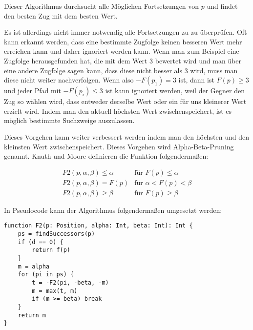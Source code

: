 Dieser Algorithmus durchsucht alle Möglichen Fortsetzungen von $p$ und findet den besten Zug mit dem besten Wert. 
\cite{knuth_analysis_1975}

Es ist allerdings nicht immer notwendig alle Fortsetzungen zu zu überprüfen. Oft kann erkannt werden, dass eine bestimmte Zugfolge keinen besseren Wert mehr erreichen kann und daher ignoriert werden kann.
Wenn man zum Beispiel eine Zugfolge herausgefunden hat, die mit dem Wert 3 bewertet wird und man über eine andere Zugfolge sagen kann, dass diese nicht besser als 3 wird, muss man diese nicht weiter nachverfolgen. Wenn also $-F(p_1) = 3$ ist, dann ist $F(p) \geq 3$ und jeder Pfad mit $-F(p_i) \leq 3$ ist kann ignoriert werden, weil der Gegner den Zug so wählen wird,  dass entweder derselbe Wert oder ein für uns kleinerer Wert erzielt wird. Indem man den aktuell höchsten Wert zwischenspeichert, ist es möglich bestimmte Suchzweige auszulassen.
\cite{knuth_analysis_1975}


Dieses Vorgehen kann weiter verbessert werden indem man den höchsten und den kleinsten Wert zwischenspeichert. Dieses Vorgehen wird Alpha-Beta-Pruning genannt. Knuth und Moore definieren die Funktion folgendermaßen:

\begin{equation}
    \begin{array}{ll}
        F2(p, \alpha, \beta) \leq \alpha & \text{für }F(p) \leq \alpha \\
        F2(p, \alpha, \beta) = F(p) & \text{für }\alpha < F(p) < \beta \\
        F2(p, \alpha, \beta) \geq \beta & \text{für }F(p) \geq \beta
    \end{array}
\end{equation}

In Pseudocode kann der Algorithmus folgendermaßen umgesetzt werden:
\begin{lstlisting}
function F2(p: Position, alpha: Int, beta: Int): Int {
    ps = findSuccessors(p)
    if (d == 0) {
        return f(p)
    }
    m = alpha
    for (pi in ps) {
        t = -F2(pi, -beta, -m)
        m = max(t, m)
        if (m >= beta) break
    }
    return m
}
\end{lstlisting}
\cite{knuth_analysis_1975}


